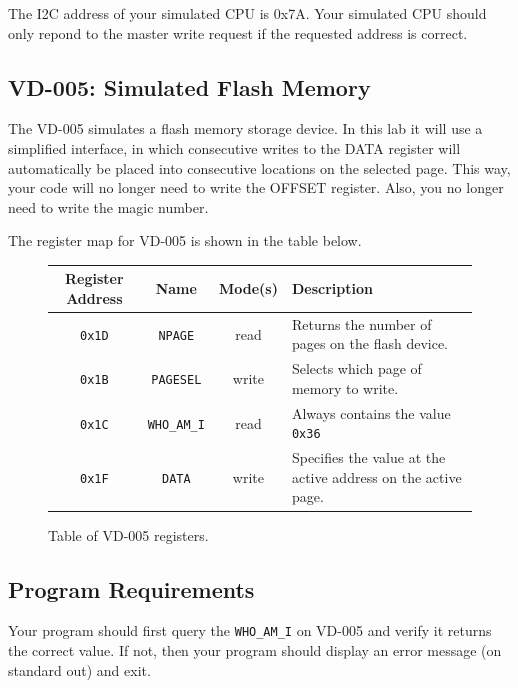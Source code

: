 \documentclass{article}
\begin{document}
The I2C address of your simulated CPU is 0x7A.  Your simulated CPU should only
repond to the master write request if the requested address is correct.

\subsection{VD-005: Simulated Flash Memory}

The VD-005 simulates a flash memory storage device. In this lab it will use a
simplified interface, in which consecutive writes to the DATA register will automatically
be placed into consecutive locations on the selected page.  This way, your code will
no longer need to write the OFFSET register.  Also, you no longer need to write the
magic number.

The register map for VD-005 is shown in the table below.

\begin{figure}[H]

	\centering

	\begin{tabular}{c | c | c | p{}}

		Register Address & Name & Mode(s) & Description \\ \hline\hline

		\texttt{0x1D} & \texttt{NPAGE} & read & Returns the number of pages on the flash device. \\ \hline

		\texttt{0x1B} & \texttt{PAGESEL} & write & Selects which page of memory to write. \\ \hline

		\texttt{0x1C} & \texttt{WHO\_AM\_I} & read & Always contains the value \texttt{0x36} \\ \hline

		\texttt{0x1F} & \texttt{DATA} & write & Specifies the value at the active address on the active page. \\


	\end{tabular}

	\caption{Table of VD-005 registers.}

\end{figure}

\subsection{Program Requirements}

Your program should first query the \texttt{WHO\_AM\_I} on VD-005 and verify it
returns the correct value. If not, then your program should display an error
message (on standard out) and exit.
\end{document}
